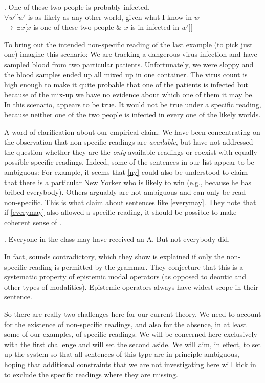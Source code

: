 \ex. One of these two people is probably infected.\\
$\forall w'[w'$ is as likely as any other world, given what I know in $w$\\
\null\hfill$ \rightarrow\ \exists x[x$ is one of these two people \& $x$ is in infected in $w'$]]

To bring out the intended non-specific reading of the last example (to pick just one) imagine this scenario: We are tracking a dangerous virus infection and have sampled blood from two particular patients. Unfortunately, we were sloppy and the blood samples ended up all mixed up in one container. The virus count is high enough to make it quite probable that one of the patients is infected but because of the mix-up we have no evidence about which one of them it may be. In this scenario, \Last appears to be true. It would not be true under a specific reading, because neither one of the two people is infected in every one of the likely worlds.

A word of clarification about our empirical claim: We have been concentrating on the observation that non-specific readings are \emph{available}, but have not addressed the question whether they are the \emph{only} available readings or coexist with equally possible specific readings. Indeed, some of the sentences in our list appear to be ambiguous: For example, it seems that \ref{ny} could also be understood to claim that there is a particular New Yorker who is likely to win (e.g., because he has bribed everybody). Others arguably are not ambiguous and can only be read non-specific. This is what \citet{fintel-iatridou:2003:ec} claim about sentences like \ref{everymay}. They note that if \ref{everymay} also allowed a specific reading, it should be possible to make coherent sense of \Next.

\ex. Everyone in the class may have received an A. But not everybody did.

In fact, \Last sounds contradictory, which they show is explained if only the non-specific reading is permitted by the grammar. They conjecture that this is a systematic property of epistemic modal operators (as opposed to deontic and other types of modalities). Epistemic operators always have widest scope in their sentence.

So there are really two challenges here for our current theory. We need to account for the existence of non-specific readings, and also for the absence, in at least some of our examples, of specific readings. We will be concerned here exclusively with the first challenge and will set the second aside. We will aim, in effect, to set up the system so that all sentences of this type are in principle ambiguous, hoping that additional constraints that we are not investigating here will kick in to exclude the specific readings where they are missing.

